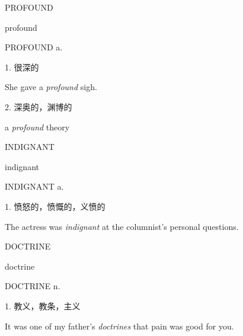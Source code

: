 \begin{flashcard}{
PROFOUND

profound
}
\begin{center}
PROFOUND a. 
\end{center}
1. 很深的

She gave a \textit{profound} sigh.

2. 深奥的，渊博的

a \textit{profound} theory

\end{flashcard}
\begin{flashcard}{
INDIGNANT

indignant
}
\begin{center}
INDIGNANT a. 
\end{center}
1. 愤怒的，愤慨的，义愤的

The actress was \textit{indignant} at the columnist's personal questions.

\end{flashcard}
\begin{flashcard}{
DOCTRINE

doctrine
}
\begin{center}
DOCTRINE n. 
\end{center}
1. 教义，教条，主义

It was one of my father's \textit{doctrines} that pain was good for you.

\end{flashcard}
